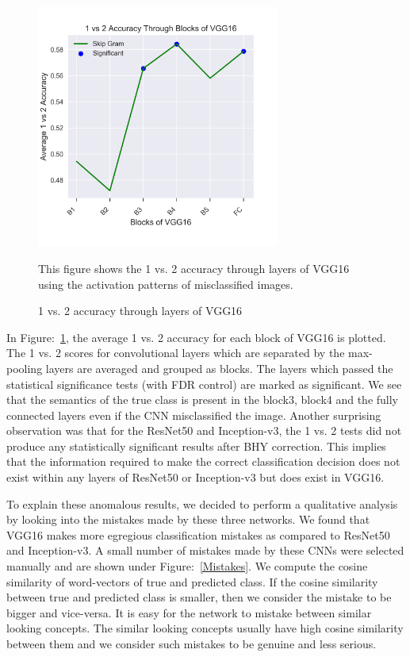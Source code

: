 \begin{figure}[t]
    \centering
    \includegraphics[width=8cm]{Figures/VGG16_12}
    \caption{1 vs. 2 accuracy through layers of VGG16}
    \label{onevstworesults}
    This figure shows the 1 vs. 2 accuracy through layers of VGG16 using the activation patterns of misclassified images.
\end{figure}
In Figure:~\ref{onevstworesults}, the average 1 vs. 2 accuracy for each block of VGG16 is plotted. The  1 vs. 2 scores for convolutional layers which are separated by the max-pooling layers are averaged and grouped as
blocks. The layers which passed the statistical significance tests (with FDR control) are marked as significant. We see that the semantics of the true class is present in the block3, block4 and the fully connected layers even if the CNN misclassified the image. Another surprising observation was that for the ResNet50 and Inception-v3, the 1 vs. 2 tests did not produce any statistically significant results after BHY correction. This implies that the information required to make the correct classification decision does not exist within any layers of ResNet50 or Inception-v3 but does exist in VGG16.



To explain these anomalous results, we decided to perform a qualitative analysis by looking into the mistakes made by these three networks. We found that VGG16 makes more egregious classification mistakes as compared to ResNet50 and Inception-v3. A small number of mistakes made by these CNNs were selected manually and are shown under Figure:~\ref{Mistakes}. We compute the cosine similarity of word-vectors of true and predicted class. If the cosine similarity between true and predicted class is smaller, then we consider the mistake to be bigger and vice-versa. It is easy for the network to mistake between similar looking concepts. The similar looking concepts usually have high cosine similarity between them and we consider such mistakes to be genuine and less serious.


